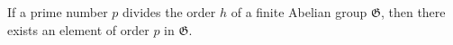 If a prime number $p$ divides the order $h$ of a finite Abelian group $\mathfrak{G}$, then there exists an element of order $p$ in $\mathfrak{G}$.
